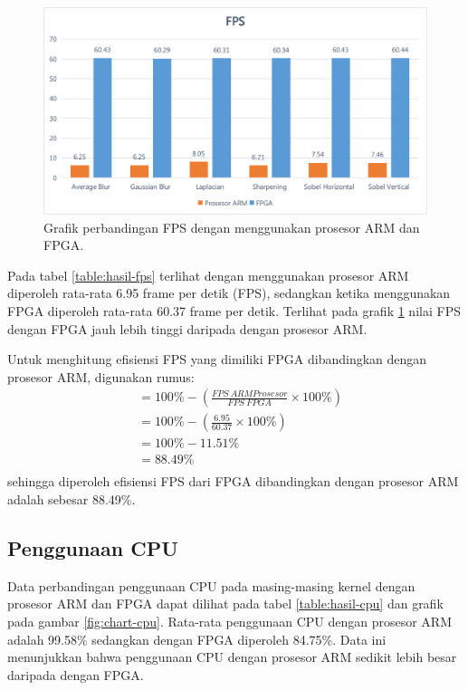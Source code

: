 \begin{figure}[H]
    \includegraphics[width=0.81\linewidth, center]{images/chart/chart-fps.png}
    \caption{Grafik perbandingan FPS dengan menggunakan prosesor ARM dan FPGA.}
    \label{fig:chart-fps}
\end{figure}

Pada tabel \ref{table:hasil-fps} terlihat dengan menggunakan prosesor ARM diperoleh rata-rata 6.95 frame per detik (FPS), sedangkan ketika menggunakan FPGA diperoleh rata-rata 60.37 frame per detik. Terlihat pada grafik \ref{fig:chart-fps} nilai FPS dengan FPGA jauh lebih tinggi daripada dengan prosesor ARM.

Untuk menghitung efisiensi FPS yang dimiliki FPGA dibandingkan dengan prosesor ARM, digunakan rumus:
\begin{equation*}
    \begin{split}
& = 100\% - \left( \frac{FPS\ ARM Prosesor}{FPS\ FPGA} \times 100\% \right) \\
& = 100\% - \left( \frac{6.95}{60.37} \times 100\% \right) \\
& = 100\% - 11.51\% \\
& = 88.49\% \\
    \end{split}
\end{equation*}
sehingga diperoleh efisiensi FPS dari FPGA dibandingkan dengan prosesor ARM adalah sebesar 88.49\%.

\subsection{Penggunaan CPU}
Data perbandingan penggunaan CPU pada masing-masing kernel dengan prosesor ARM dan FPGA dapat dilihat pada tabel \ref{table:hasil-cpu} dan grafik pada gambar \ref{fig:chart-cpu}. Rata-rata penggunaan CPU dengan prosesor ARM adalah 99.58\% sedangkan dengan FPGA diperoleh 84.75\%. Data ini menunjukkan bahwa penggunaan CPU dengan prosesor ARM sedikit lebih besar daripada dengan FPGA.

